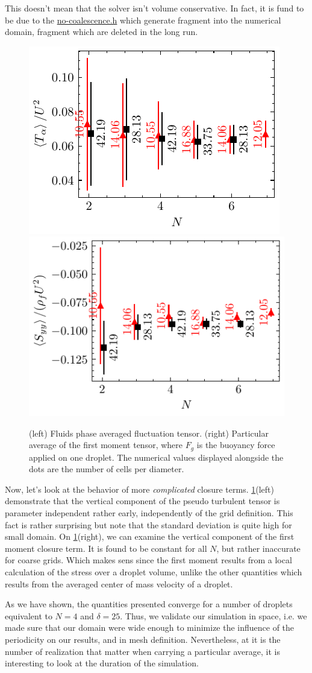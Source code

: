 This doesn't mean that the solver isn't volume conservative. 
In fact, it is fund to be due to the \href{http://basilisk.fr/sandbox/fintzin/Rising-Suspension/no-coalescence.h}{no-coalescence.h} which generate fragment into the numerical domain, fragment which are deleted in the long run. 
\begin{figure}[h!]
    \centering
    \includegraphics[height= 0.3\textwidth]{image/VALIDATION/N_and_delta/PA_UpUp.pdf}
    \includegraphics[height= 0.3\textwidth]{image/VALIDATION/N_and_delta/Mh.pdf}
    \caption{(left) Fluids phase averaged fluctuation tensor.
            (right) Particular average of the first moment tensor, where $F_g$ is the buoyancy force applied on one droplet. 
            The numerical values displayed alongside the dots are the number of cells per diameter.}
    \label{fig:VALIDATION_Nd_2}
\end{figure}
Now, let's look at the behavior of more \textit{complicated} closure terms. 
\ref{fig:VALIDATION_Nd_2}(left) demonstrate that the vertical component of the pseudo turbulent tensor is parameter independent rather early, independently of the grid definition. 
This fact is rather surprising but note that the standard deviation is quite high for small domain. 
On \ref{fig:VALIDATION_Nd_2}(right), we can examine the vertical component of the first moment closure term. 
It is found to be constant for all $N$, but rather inaccurate for coarse grids. 
Which makes sens since the first moment results from a local calculation of the stress over a droplet volume, unlike the other quantities which results from the averaged center of mass velocity of a droplet. 

As we have shown, the quantities presented converge for a number of droplets equivalent to $N = 4$ and $\delta = 25$. 
Thus, we validate our simulation in space, i.e. we made sure that our domain were wide enough to minimize the influence of the periodicity on our results, and in mesh definition. 
Nevertheless, at it is the number of realization that matter when carrying a particular average, it is interesting to look at the duration of the simulation.


